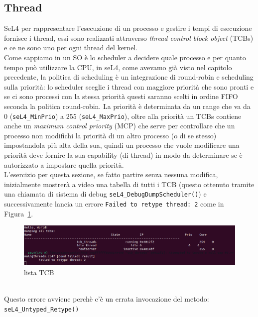\subsection{Thread}
SeL4 per rappresentare l'esecuzione di un processo e gestire i tempi di esecuzione fornisce i thread, essi sono realizzati attraverso \textit{thread control block object} (TCBs) e ce ne sono uno per ogni thread del kernel.\\
Come sappiamo in un SO è lo scheduler a decidere quale processo e per quanto tempo può utilizzare la CPU, in seL4, come avevamo già visto nel capitolo precedente, la politica di scheduling è un integrazione di round-robin e scheduling sulla priorità: lo scheduler sceglie i thread con maggiore priorità che sono pronti e se ci sono processi con la stessa priorità questi saranno scelti in ordine FIFO seconda la politica round-robin. La priorità è determinata da un range che va da 0 (\texttt{seL4\_MinPrio}) a 255 (\texttt{seL4\_MaxPrio}), oltre alla priorità un TCBs contiene anche un \textit{maximum control priority} (MCP) che serve per controllare che un processo non modifichi la priorità di un altro processo (o di se stesso) impostandola più alta della sua, quindi un processo che vuole modificare una priorità deve fornire la sua capability (di thread) in modo da determinare se è autorizzato a impostare quella priorità.\\
L'esercizio per questa sezione, se fatto partire senza nessuna modifica, inizialmente mostrerà a video una tabella di tutti i TCB (questo ottenuto tramite una chiamata di sistema di debug \texttt{seL4\_DebugDumpScheduler()}) e successivamente lancia un errore \texttt{Failed to retype thread: 2} come in Figura~\ref{fig:TutorialThreads}.\\
\begin{figure}[h]
  \includegraphics[width=\linewidth]{img/Threads.png}
  \caption{lista TCB}
  \label{fig:TutorialThreads}
\end{figure}
\\Questo errore avviene perchè c'è un errata invocazione del metodo: \texttt{seL4\_Untyped\_Retype()}
